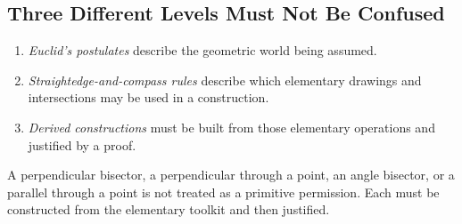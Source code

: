 \subsection{Three Different Levels Must Not Be Confused}

\begin{corebox}
\begin{enumerate}
    \item \emph{Euclid's postulates} describe the geometric world being assumed.
    \item \emph{Straightedge-and-compass rules} describe which elementary
          drawings and intersections may be used in a construction.
    \item \emph{Derived constructions} must be built from those elementary
          operations and justified by a proof.
\end{enumerate}
\end{corebox}

\begin{remarkbox}
A perpendicular bisector, a perpendicular through a point, an angle bisector,
or a parallel through a point is not treated as a primitive permission. Each
must be constructed from the elementary toolkit and then justified.
\end{remarkbox}
